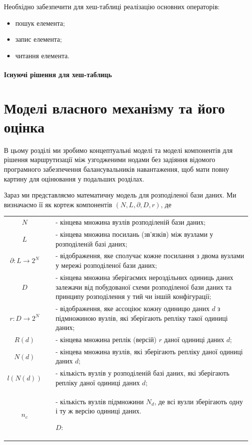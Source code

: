 \documentclass[14pt]{vakthesis}
\begin{document}
Необхідно забезпечити для хеш-таблиці реалізацію основних операторів:
\begin{itemize}
\item пошук елемента;
\item запис елемента;
\item читання елемента. 
\end{itemize}

\paragraph{Існуючі рішення для хеш-таблиць}

\section{Моделі власного механізму та його оцінка}
В цьому розділі ми зробимо концептуальні моделі та моделі компонентів для рішення маршрутизації між узгодженими нодами без задіяння відомого програмного забезпечення балансувальників навантаження, щоб мати повну картину для оцінювання у подальших розділах.

Зараз ми представляємо математичну модель для розподіленої бази даних.
Ми визначаємо її як кортеж компонентів $(N, L, \partial,D, r)$, де \\

\begin{tabular*}{\textwidth}{cp{0.5cm}p{}}\label{tb:mm_first}
$N$&& - кінцева множина вузлів розподіленій бази даних; \\
$L$&& - кінцева множина посилань (зв'язків) між вузлами у розподіленiй базі даних; \\
$\partial:L\rightarrow 2^N$&& - відображення, яке  сполучає кожне посилання з двома вузлами у мережі розподіленої бази даних;\\
$D$&& - кінцева множина зберігаємих нероздільних одиниць даних залежачи від побудованої схеми розподіленої бази даних та принципу розподілення у тий чи іншій конфігурації;\\
$r:D\rightarrow 2^N$&& - відображення, яке ассоціює кожну одиницю даних $d$ з підмножиною вузлів, які зберігають репліку такої одиниці даних; \\

$R(d)$&& - кінцева множина реплік (версій) $r$ даної одиниці даних $d$;\\
$N(d)$&& - кінцева множина вузлів, які зберігають репліку даної одиниці даних $d$; \\
$l(N(d))$&& - кількість вузлів у розподіленій базі даних, які зберігають репліку даної одиниці даних $d$; \\
$n_c$&& - кількість вузлів підмножини $N_d$, де всі вузли зберігають одну і ту ж версію одиниці даних.

$D:$
\end{tabular*}
\end{document}
